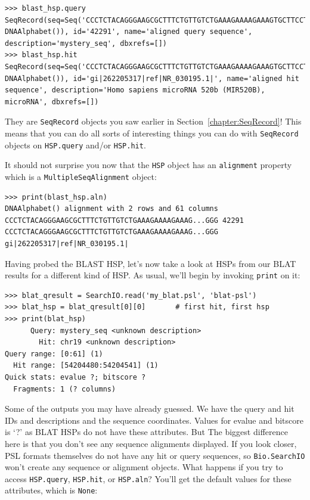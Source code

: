 \documentclass{report}
\begin{document}
\begin{verbatim}
>>> blast_hsp.query
SeqRecord(seq=Seq('CCCTCTACAGGGAAGCGCTTTCTGTTGTCTGAAAGAAAAGAAAGTGCTTCCTTT...GGG', DNAAlphabet()), id='42291', name='aligned query sequence', description='mystery_seq', dbxrefs=[])
>>> blast_hsp.hit
SeqRecord(seq=Seq('CCCTCTACAGGGAAGCGCTTTCTGTTGTCTGAAAGAAAAGAAAGTGCTTCCTTT...GGG', DNAAlphabet()), id='gi|262205317|ref|NR_030195.1|', name='aligned hit sequence', description='Homo sapiens microRNA 520b (MIR520B), microRNA', dbxrefs=[])
\end{verbatim}

They are \verb|SeqRecord| objects you saw earlier in
Section~\ref{chapter:SeqRecord}! This means that you can do all sorts of
interesting things you can do with \verb|SeqRecord| objects on \verb|HSP.query|
and/or \verb|HSP.hit|. 

It should not surprise you now that the \verb|HSP| object has an
\verb|alignment| property which is a \verb|MultipleSeqAlignment| object:

\begin{verbatim}
>>> print(blast_hsp.aln)
DNAAlphabet() alignment with 2 rows and 61 columns
CCCTCTACAGGGAAGCGCTTTCTGTTGTCTGAAAGAAAAGAAAG...GGG 42291
CCCTCTACAGGGAAGCGCTTTCTGTTGTCTGAAAGAAAAGAAAG...GGG gi|262205317|ref|NR_030195.1|
\end{verbatim}

Having probed the BLAST HSP, let's now take a look at HSPs from our BLAT
results for a different kind of HSP. As usual, we'll begin by invoking
\verb|print| on it:

\begin{verbatim}
>>> blat_qresult = SearchIO.read('my_blat.psl', 'blat-psl')
>>> blat_hsp = blat_qresult[0][0]       # first hit, first hsp
>>> print(blat_hsp)
      Query: mystery_seq <unknown description>
        Hit: chr19 <unknown description>
Query range: [0:61] (1)
  Hit range: [54204480:54204541] (1)
Quick stats: evalue ?; bitscore ?
  Fragments: 1 (? columns)
\end{verbatim}

Some of the outputs you may have already guessed. We have the query and hit IDs
and descriptions and the sequence coordinates. Values for evalue and bitscore is
`?' as BLAT HSPs do not have these attributes. But The biggest difference here
is that you don't see any sequence alignments displayed. If you look closer, PSL
formats themselves do not have any hit or query sequences, so
\verb|Bio.SearchIO| won't create any sequence or alignment objects. What happens
if you try to access \verb|HSP.query|, \verb|HSP.hit|, or \verb|HSP.aln|?
You'll get the default values for these attributes, which is \verb|None|:
\end{document}
